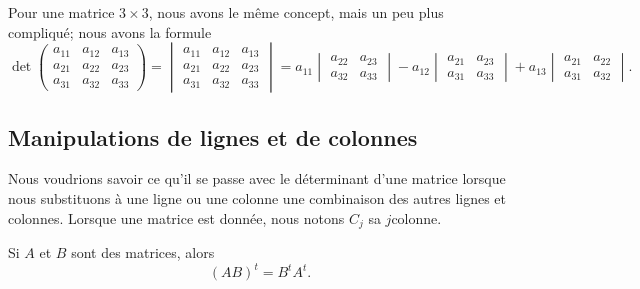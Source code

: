 Pour une matrice $3\times 3$, nous avons le même concept, mais un peu plus compliqué; nous avons la formule
\begin{equation}
    \det
    \begin{pmatrix}
        a_{11}    &   a_{12}    &   a_{13}    \\
        a_{21}    &   a_{22}    &   a_{23}    \\
        a_{31}    &   a_{32}    &   a_{33}
    \end{pmatrix}
    =
    \begin{vmatrix}
        a_{11}    &   a_{12}    &   a_{13}    \\
        a_{21}    &   a_{22}    &   a_{23}    \\
        a_{31}    &   a_{32}    &   a_{33}
    \end{vmatrix}=
    a_{11}\begin{vmatrix}
        a_{22}  &   a_{23}    \\
        a_{32}    &   a_{33}
    \end{vmatrix}-
    a_{12}\begin{vmatrix}
        a_{21}  &   a_{23}    \\
        a_{31}    &   a_{33}
    \end{vmatrix}+
    a_{13}\begin{vmatrix}
        a_{21}  &   a_{22}    \\
        a_{31}    &   a_{32}
    \end{vmatrix}.
\end{equation}

\subsection{Manipulations de lignes et de colonnes}

Nous voudrions savoir ce qu'il se passe avec le déterminant d'une matrice lorsque nous substituons à une ligne ou une colonne une combinaison des autres lignes et colonnes. Lorsque une matrice est donnée, nous notons \( C_j\) sa \( j\)\ieme colonne.

\begin{lemma}        \label{LEMooRSJTooQEoOtN}
    Si \( A\) et \( B\) sont des matrices, alors
    \begin{equation}
        (AB)^t=B^tA^t.
    \end{equation}
\end{lemma}

